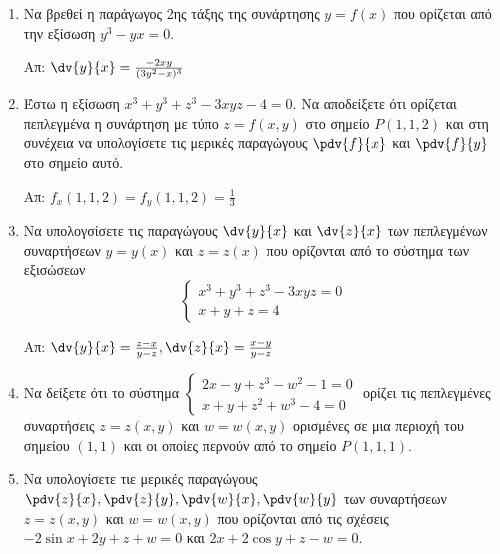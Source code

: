 



\everymath{\displaystyle}
\thispagestyle{empty}



\begin{center}
\end{center}


\vspace{\baselineskip}

\begin{enumerate}

	\item Να βρεθεί η παράγωγος 2ης τάξης της συνάρτησης $ y=f(x) $ που ορίζεται από την εξίσωση $
		y^{3} - yx = 0 $.

		\hfill Απ: $ \dv{y}{x} = \frac{ -2xy }{ (3y^{2} - x)^{3} }  $ 

	\item Έστω η εξίσωση $ x^{3} + y^{3} + z^{3} - 3xyz - 4 = 0 $. Να αποδείξετε ότι ορίζεται
		πεπλεγμένα η συνάρτηση με τύπο $ z = f(x,y) $ στο σημείο $ P(1,1,2) $ και στη συνέχεια να
		υπολογίσετε τις μερικές παραγώγους $ \pdv{f}{x} $ και $ \pdv{f}{y} $ στο σημείο αυτό.

		\hfill Απ: $ f_{x}(1,1,2) = f_{y}(1,1,2) = \frac{ 1 }{ 3 } $ 

	\item Να υπολογσίσετε τις παραγώγους $ \dv{y}{x} $ και $ \dv{z}{x}$ των πεπλεγμένων συναρτήσεων
		$ y=y(x) $ και $ z=z(x) $ που ορίζονται από το σύστημα των εξισώσεων \[ \begin{cases} x^{3} + y^{3} + z^{3} -3xyz = 0 \\
		x+y+z=4 \end{cases}\] 

		\hfill Απ: $ \dv{y}{x} = \frac{ z-x }{ y-z }, \dv{z}{x} = \frac{ x-y }{ y-z } $ 

	\item Να δείξετε ότι το σύστημα $ \begin{cases}
			2x-y+z^{3}-w^{2}-1=0 \\
			x+y+z^{2}+w^{3}-4=0
		\end{cases} $ ορίζει τις πεπλεγμένες συναρτήσεις $ z = z(x,y) $ και $ w = w(x,y) $
		ορισμένες σε μια περιοχή του σημείου $ (1,1) $ και οι οποίες περνούν από το σημείο $
		P(1,1,1) $.


	\item Να υπολογίσετε τιε μερικές παραγώγους $ \pdv{z}{x}, \pdv{z}{y}, \pdv{w}{x},
		\pdv{w}{y} $ των συναρτήσεων $ z = z(x,y) $ και $ w = w(x,y) $ που ορίζονται από τις σχέσεις
		$ -2 \sin{x} + 2y + z + w = 0 $ και $ 2x + 2 \cos{y} + z - w = 0 $.


\end{enumerate}
